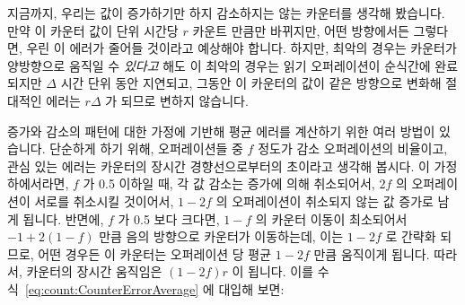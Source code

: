 {	지금까지, 우리는 값이 증가하기만 하지 감소하지는 않는 카운터를 생각해
	봤습니다.
	만약 이 카운터 값이 단위 시간당 $r$ 카운트 만큼만 바뀌지만, 어떤
	방향에서든 그렇다면, 우린 이 에러가 줄어들 것이라고 예상해야 합니다.
	하지만, 최악의 경우는 카운터가 양방향으로 움직일 수 \emph{있다고} 해도
	이 최악의 경우는 읽기 오퍼레이션이 순식간에 완료되지만 $\Delta$ 시간
	단위 동안 지연되고, 그동안 이 카운터의 값이 같은 방향으로 변화해
	절대적인 에러는 $r \Delta$ 가 되므로 변하지 않습니다.

	증가와 감소의 패턴에 대한 가정에 기반해 평균 에러를 계산하기 위한 여러
	방법이 있습니다.
	단순하게 하기 위해, 오퍼레이션들 중 $f$ 정도가 감소 오퍼레이션의
	비율이고, 관심 있는 에러는 카운터의 장시간 경향선으로부터의 초이라고
	생각해 봅시다.  이 가정 하에서라면, $f$ 가 0.5 이하일 때, 각 값 감소는
	증가에 의해 취소되어서, $2f$ 의 오퍼레이션이 서로를 취소시킬 것이어서,
	$1-2f$ 의 오퍼레이션이 취소되지 않는 값 증가로 남게 됩니다.
	반면에, $f$ 가 0.5 보다 크다면, $1-f$ 의 카운터 이동이 최소되어서
	$-1+2\left(1-f\right)$ 만큼 음의 방향으로 카운터가 이동하는데, 이는
	$1-2f$ 로 간략화 되므로, 어떤 경우든 이 카운터는 오퍼레이션 당 평균
	$1-2f$ 만큼 움직이게 됩니다.
	따라서, 카운터의 장시간 움직임은 $\left( 1-2f \right) r$ 이 됩니다.
	이를 수식~\ref{eq:count:CounterErrorAverage} 에 대입해 보면:

	\iffalse

}
